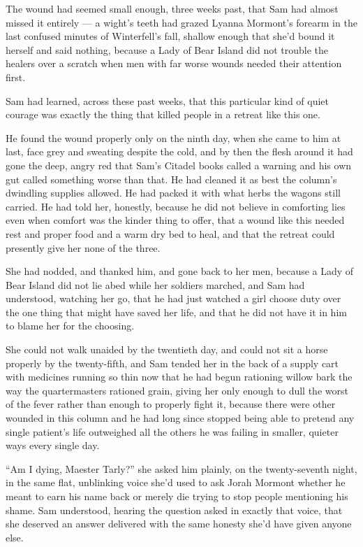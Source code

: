 The wound had seemed small enough, three weeks past, that Sam had almost missed it entirely — a wight’s teeth had grazed Lyanna Mormont’s forearm in the last confused minutes of Winterfell’s fall, shallow enough that she’d bound it herself and said nothing, because a Lady of Bear Island did not trouble the healers over a scratch when men with far worse wounds needed their attention first.

Sam had learned, across these past weeks, that this particular kind of quiet courage was exactly the thing that killed people in a retreat like this one.

He found the wound properly only on the ninth day, when she came to him at last, face grey and sweating despite the cold, and by then the flesh around it had gone the deep, angry red that Sam’s Citadel books called a warning and his own gut called something worse than that. He had cleaned it as best the column’s dwindling supplies allowed. He had packed it with what herbs the wagons still carried. He had told her, honestly, because he did not believe in comforting lies even when comfort was the kinder thing to offer, that a wound like this needed rest and proper food and a warm dry bed to heal, and that the retreat could presently give her none of the three.

She had nodded, and thanked him, and gone back to her men, because a Lady of Bear Island did not lie abed while her soldiers marched, and Sam had understood, watching her go, that he had just watched a girl choose duty over the one thing that might have saved her life, and that he did not have it in him to blame her for the choosing.

\sceneBreak

She could not walk unaided by the twentieth day, and could not sit a horse properly by the twenty-fifth, and Sam tended her in the back of a supply cart with medicines running so thin now that he had begun rationing willow bark the way the quartermasters rationed grain, giving her only enough to dull the worst of the fever rather than enough to properly fight it, because there were other wounded in this column and he had long since stopped being able to pretend any single patient’s life outweighed all the others he was failing in smaller, quieter ways every single day.

“Am I dying, Maester Tarly?” she asked him plainly, on the twenty-seventh night, in the same flat, unblinking voice she’d used to ask Jorah Mormont whether he meant to earn his name back or merely die trying to stop people mentioning his shame. Sam understood, hearing the question asked in exactly that voice, that she deserved an answer delivered with the same honesty she’d have given anyone else.

